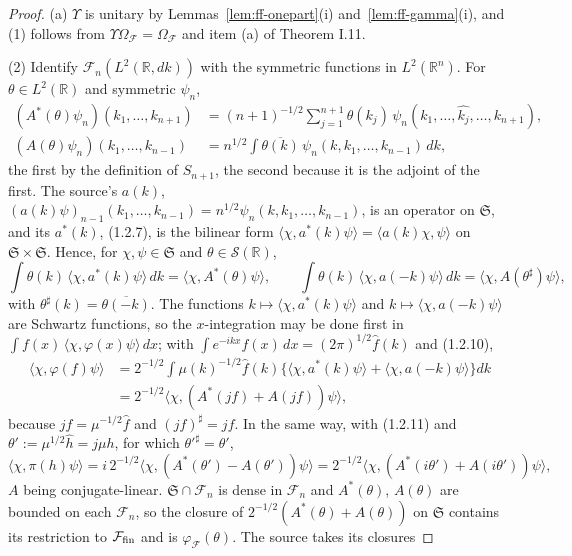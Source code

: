\documentclass[11pt,a4paper]{article}
\theoremstyle{plain}
\theoremstyle{definition}
\theoremstyle{plain}
\theoremstyle{definition}
\newcommand{\R}{\mathbb{R}}
\newcommand{\ip}[2]{\langle #1,#2\rangle}
\begin{document}
\begin{proof}
(a) $\Upsilon$ is unitary by Lemmas~\ref{lem:ff-onepart}(i) and~\ref{lem:ff-gamma}(i), and (1)
follows from $\Upsilon\Omega_{\mathcal F}=\Omega_{\mathcal F}$ and item (a) of Theorem I.11.

(2) Identify $\mathcal F_n(L^2(\R,dk))$ with the symmetric functions in $L^2(\R^n)$.  For
$\theta\in L^2(\R)$ and symmetric $\psi_n$,
\begin{align*}
 (A^*(\theta)\psi_n)(k_1,\dots,k_{n+1})&=(n+1)^{-1/2}\sum_{j=1}^{n+1}\theta(k_j)\,
 \psi_n(k_1,\dots,\widehat{k_j},\dots,k_{n+1}),\\
 (A(\theta)\psi_n)(k_1,\dots,k_{n-1})&=n^{1/2}\!\int\!\overline{\theta(k)}\,\psi_n(k,k_1,\dots,
 k_{n-1})\,dk ,
\end{align*}
the first by the definition of $S_{n+1}$, the second because it is the adjoint of the first.
The source's $a(k)$, $(a(k)\psi)_{n-1}(k_1,\dots,k_{n-1})=n^{1/2}\psi_n(k,k_1,\dots,k_{n-1})$,
is an operator on $\mathfrak S$, and its $a^*(k)$, (1.2.7), is the bilinear form
$\ip\chi{a^*(k)\psi}=\ip{a(k)\chi}\psi$ on $\mathfrak S\times\mathfrak S$.  Hence, for
$\chi,\psi\in\mathfrak S$ and $\theta\in\mathcal S(\R)$,
\[
 \int\theta(k)\,\ip\chi{a^*(k)\psi}\,dk=\ip\chi{A^*(\theta)\psi},\qquad
 \int\theta(k)\,\ip\chi{a(-k)\psi}\,dk=\ip\chi{A(\theta^\sharp)\psi},
\]
with $\theta^\sharp(k)=\overline{\theta(-k)}$.  The functions $k\mapsto\ip\chi{a^*(k)\psi}$ and
$k\mapsto\ip\chi{a(-k)\psi}$ are Schwartz functions, so the $x$-integration may be done first
in $\int f(x)\,\ip\chi{\varphi(x)\psi}\,dx$; with $\int e^{-ikx}f(x)\,dx=(2\pi)^{1/2}\hat f(k)$
and (1.2.10),
\begin{align*}
 \ip\chi{\varphi(f)\psi}&=2^{-1/2}\!\int\!\mu(k)^{-1/2}\hat f(k)\bigl\{\ip\chi{a^*(k)\psi}+
 \ip\chi{a(-k)\psi}\bigr\}dk\\
 &=2^{-1/2}\ip\chi{(A^*(jf)+A(jf))\psi},
\end{align*}
because $jf=\mu^{-1/2}\hat f$ and $(jf)^\sharp=jf$.  In the same way, with (1.2.11) and
$\theta':=\mu^{1/2}\hat h=j\mu h$, for which $\theta'^\sharp=\theta'$,
\[
 \ip\chi{\pi(h)\psi}=i\,2^{-1/2}\ip\chi{(A^*(\theta')-A(\theta'))\psi}
 =2^{-1/2}\ip\chi{(A^*(i\theta')+A(i\theta'))\psi},
\]
$A$ being conjugate-linear.  $\mathfrak S\cap\mathcal F_n$ is dense in $\mathcal F_n$ and
$A^*(\theta)$, $A(\theta)$ are bounded on each $\mathcal F_n$, so the closure of
$2^{-1/2}(A^*(\theta)+A(\theta))$ on $\mathfrak S$ contains its restriction to
$\mathcal F_{\rm fin}$ and is $\varphi_{\mathcal F}(\theta)$.  The source takes its closures

\end{proof}
\end{document}

